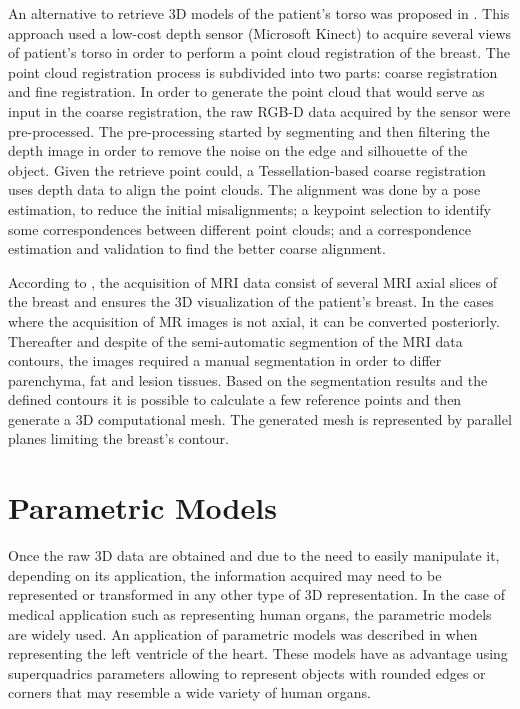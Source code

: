 An alternative to retrieve 3D models of the patient's torso was proposed in \cite{Costa2014}. This approach used a low-cost depth sensor (Microsoft Kinect) to acquire several views of patient's torso in order to perform a point cloud registration of the breast. The point cloud registration process is subdivided into two parts: coarse registration and fine registration. In order to generate the point cloud that would serve as input in the coarse registration, the raw RGB-D data acquired by the sensor were pre-processed. The pre-processing started by segmenting and then filtering the depth image in order to remove the noise on the edge and silhouette of the object. Given the retrieve point could, a Tessellation-based coarse registration uses depth data to align the point clouds. The alignment was done by a pose estimation, to reduce the initial misalignments; a keypoint selection to identify some correspondences between different point clouds; and a correspondence estimation and validation to find the better coarse alignment.

According to \citet{apenn}, the acquisition of MRI data consist of several MRI axial slices of the breast and ensures the 3D visualization of the patient's breast. In the cases where the acquisition of MR images is not axial, it can be converted posteriorly. Thereafter and despite of the semi-automatic segmention of the MRI data contours, the images required a manual segmentation in order to differ parenchyma, fat and lesion tissues. Based on the segmentation results and the defined contours it is possible to calculate a few reference points and then generate a 3D computational mesh. The generated mesh is represented by parallel planes limiting the breast's contour.

\section{Parametric Models}\label{sec:param}

Once the raw 3D data are obtained and due to the need to easily manipulate it, depending on its application, the information acquired may need to be represented or transformed in any other type of 3D representation. In the case of medical application such as representing human organs, the parametric models are widely used. An application of parametric models was described in \cite{Vision1998} when representing the left ventricle of the heart. These models have as advantage using superquadrics parameters allowing to represent objects with rounded edges or corners that may resemble a wide variety of human organs. 

